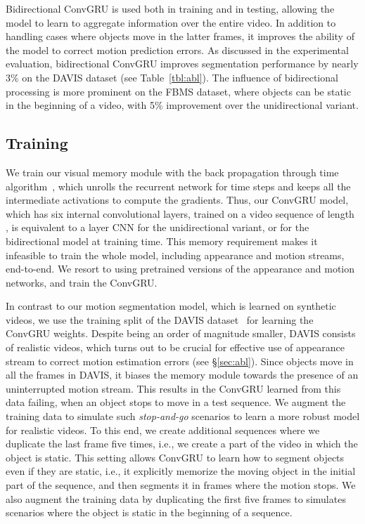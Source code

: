Bidirectional ConvGRU is used both in training and in testing, allowing the
model to learn to aggregate information over the entire video. In addition to
handling cases where objects move in the latter frames, it improves the ability
of the model to correct motion prediction errors. As discussed in the
experimental evaluation, bidirectional ConvGRU improves segmentation
performance by nearly 3\% on the DAVIS dataset (see Table~\ref{tbl:abl}). The
influence of bidirectional processing is more prominent on the FBMS dataset, where objects can be static in the beginning of a video,
with 5\% improvement over the unidirectional variant.

\subsection{Training}
\label{sec:train}
We train our visual memory module with the back propagation through time
algorithm~\cite{werbos1990backpropagation}, which unrolls the recurrent network
for  time steps and keeps all the intermediate activations to compute the
gradients. Thus, our ConvGRU model, which has six internal convolutional
layers, trained on a video sequence of length , is equivalent to a 
layer CNN for the unidirectional variant, or  for the bidirectional model
at training time. This memory requirement makes it infeasible to train the
whole model, including appearance and motion streams, end-to-end. We resort to
using pretrained versions of the appearance and motion networks, and train the
ConvGRU.

In contrast to our motion segmentation model, which is learned on synthetic
videos, we use the training split of the DAVIS dataset~\cite{Perazzi16} for
learning the ConvGRU weights. Despite being an order of magnitude smaller,
DAVIS consists of realistic videos, which turns out to be crucial for effective
use of appearance stream to correct motion estimation errors (see
\S\ref{sec:abl}). Since objects move in all the frames in DAVIS, it biases the
memory module towards the presence of an uninterrupted motion stream. This
results in the ConvGRU learned from this data failing, when an object stops to
move in a test sequence. We augment the training data to simulate such {\it
stop-and-go} scenarios to learn a more robust model for realistic
videos.
To this end, we create additional sequences where we duplicate
  the last frame five times, i.e., we create a part of the video in
  which the object is static. This setting allows ConvGRU to learn how
  to segment objects even if they are static, i.e.,  it explicitly
  memorize the moving object in the initial part of the sequence, and
  then segments it in frames where the motion stops. 
We also augment the training data by duplicating the first five frames
to simulates scenarios where the object is static in the beginning
of a sequence.  

